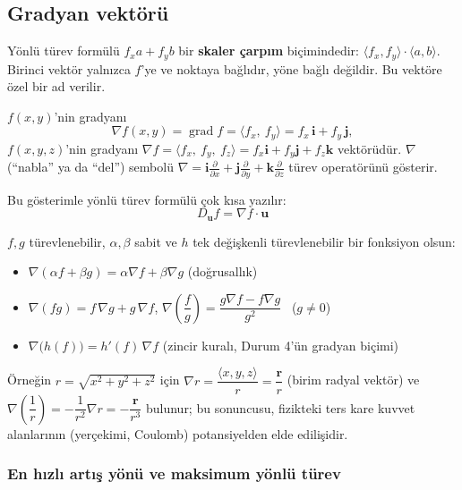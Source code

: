\subsection{Gradyan vektörü}

Yönlü türev formülü $f_x a+f_y b$ bir \textbf{skaler çarpım} biçimindedir: $\langle f_x,f_y\rangle\cdot\langle a,b\rangle$.
Birinci vektör yalnızca $f$'ye ve noktaya bağlıdır, yöne bağlı değildir. Bu vektöre özel bir ad verilir.

\begin{tanim}[Gradyan]
$f(x,y)$'nin gradyanı
\[
\nabla f(x,y)=\operatorname{grad}f=\langle f_x,\ f_y\rangle=f_x\,\mathbf i+f_y\,\mathbf j ,
\]
$f(x,y,z)$'nin gradyanı $\nabla f=\langle f_x,\ f_y,\ f_z\rangle=f_x\mathbf i+f_y\mathbf j+f_z\mathbf k$ vektörüdür.
$\nabla$ (``nabla'' ya da ``del'') sembolü $\nabla=\mathbf i\frac{\partial}{\partial x}+\mathbf j\frac{\partial}{\partial y}+\mathbf k\frac{\partial}{\partial z}$
türev operatörünü gösterir.
\end{tanim}

Bu gösterimle yönlü türev formülü çok kısa yazılır:
\[
\boxed{D_{\mathbf u}f=\nabla f\cdot\mathbf u}
\]

\begin{teorem}
$f,g$ türevlenebilir, $\alpha,\beta$ sabit ve $h$ tek değişkenli türevlenebilir bir fonksiyon olsun:
\begin{itemize}
  \item $\nabla(\alpha f+\beta g)=\alpha\nabla f+\beta\nabla g$ \quad (doğrusallık)
  \item $\nabla(fg)=f\,\nabla g+g\,\nabla f$, \qquad $\nabla\left(\dfrac fg\right)=\dfrac{g\nabla f-f\nabla g}{g^2}$ \ ($g\ne0$)
  \item $\nabla\big(h(f)\big)=h'(f)\,\nabla f$ \quad (zincir kuralı, Durum 4'ün gradyan biçimi)
\end{itemize}
\end{teorem}
Örneğin $r=\sqrt{x^2+y^2+z^2}$ için $\nabla r=\dfrac{\langle x,y,z\rangle}{r}=\dfrac{\mathbf r}{r}$ (birim radyal vektör) ve
$\nabla\left(\dfrac1r\right)=-\dfrac{1}{r^2}\nabla r=-\dfrac{\mathbf r}{r^3}$ bulunur; bu sonuncusu, fizikteki ters kare
kuvvet alanlarının (yerçekimi, Coulomb) potansiyelden elde edilişidir.

\subsubsection{En hızlı artış yönü ve maksimum yönlü türev}

